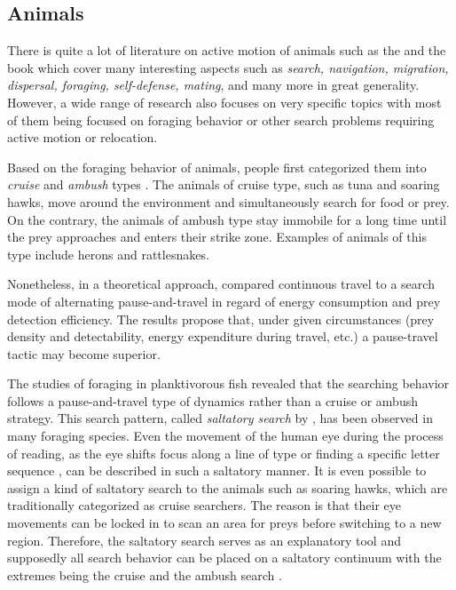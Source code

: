 \subsection*{Animals}
There is quite a lot of literature on active motion of animals such as the  and the book  which cover many interesting aspects such as \emph{search, navigation, migration, dispersal, foraging, self-defense, mating}, and many more in great generality. However, a wide range of research also focuses on very specific topics with most of them being focused on foraging behavior or other search problems requiring active motion or relocation.

Based on the foraging behavior of animals, people first categorized them into \textit{cruise} and \textit{ambush} types \cite{greene:1983}. The animals of cruise type, such as tuna and soaring hawks, move around the environment and simultaneously search for food or prey. On the contrary, the animals of ambush type stay immobile for a long time until the prey approaches and enters their strike zone. Examples of animals of this type include herons and rattlesnakes.

Nonetheless, in a theoretical approach,  compared continuous travel to a search mode of alternating pause-and-travel in regard of energy consumption and prey detection efficiency. The results propose that, under given circumstances (prey density and detectability, energy expenditure during travel, etc.) a pause-travel tactic may become superior.

The studies of foraging in planktivorous fish \cite{obrien:1990} revealed that the searching behavior follows a pause-and-travel type of dynamics rather than a cruise or ambush strategy. This search pattern, called \textit{saltatory search} by , has been observed in many foraging species. Even the movement of the human eye during the process of reading, as the eye shifts focus along a line of type \cite{huey:1968} or finding a specific letter sequence \cite{chase:1986}, can be described in such a saltatory manner. It is even possible to assign a kind of saltatory search to the animals such as soaring hawks, which are traditionally categorized as cruise searchers. The reason is that their eye movements can be locked in to scan an area for preys before switching to a new region. Therefore, the saltatory search serves as an explanatory tool and supposedly all search behavior can be placed on a saltatory continuum with the extremes being the cruise and the ambush search \cite{obrien:1990}.


